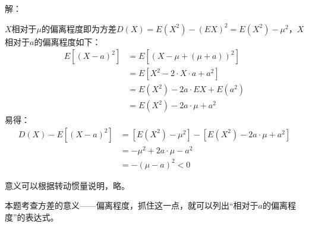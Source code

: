 解：

$X$相对于$\mu $的偏离程度即为方差$D\left( X \right) =E\left( X^2 \right) -\left( EX \right) ^2=E\left( X^2 \right) -\mu ^2$，$X$相对于$a$的偏离程度如下：
\begin{align*}
E\left[ \left( X-a \right) ^2 \right] &=E\left[ \left( X-\mu +\left( \mu +a \right) \right) ^2 \right] \\
&=E\left[ X^2-2\cdot X\cdot a+a^2 \right] \\
&=E\left( X^2 \right) -2a\cdot EX+E\left( a^2 \right) \\
&=E\left( X^2 \right) -2a\cdot \mu +a^2
\end{align*}
易得：
\begin{align*}
D\left( X \right) -E\left[ \left( X-a \right) ^2 \right] &=\left[ E\left( X^2 \right) -\mu ^2 \right] -\left[ E\left( X^2 \right) -2a\cdot \mu +a^2 \right] \\
&=-\mu ^2+2a\cdot \mu -a^2 \\
&=-\left( \mu -a \right) ^2<0
\end{align*}

意义可以根据转动惯量说明，略。

\begin{tcolorbox}
本题考查方差的意义——偏离程度，抓住这一点，就可以列出“相对于$a$的偏离程度”的表达式。
\end{tcolorbox}




